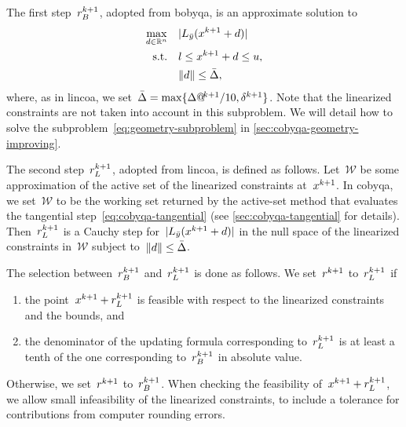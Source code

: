 The first step~$\rstep[k + 1]_B$, adopted from \gls{bobyqa}, is an approximate solution to
\begin{subequations}
    \label{eq:geometry-subproblem}
    \begin{align}
        \max_{\step \in \R^n}   & \quad \abs{\lagp[\bar{y}](\iter[k + 1] + \step)}\\
        \text{s.t.}             & \quad \xl \le \iter[k + 1] + \step \le \xu,\\
                                & \quad \norm{\step} \le \bar{\rad},
    \end{align}
\end{subequations}
where, as in \gls{lincoa}, we set~$\bar{\rad} = \max \set{\rad[k + 1] / 10, \radlb[k + 1]}$.
Note that the linearized constraints are not taken into account in this subproblem.
We will detail how to solve the subproblem~\cref{eq:geometry-subproblem} in \cref{sec:cobyqa-geometry-improving}.

The second step~$\rstep[k + 1]_L$, adopted from \gls{lincoa}, is defined as follows.
Let~$\mathcal{W}$ be some approximation of the active set of the linearized constraints at~$\iter[k + 1]$.
In \gls{cobyqa}, we set~$\mathcal{W}$ to be the working set returned by the active-set method that evaluates the tangential step~\cref{eq:cobyqa-tangential} (see \cref{sec:cobyqa-tangential} for details).
Then~$\rstep[k + 1]_L$ is a Cauchy step for~$\abs{\lagp[\bar{y}](\iter[k + 1] + \step)}$ in the null space of the linearized constraints in~$\mathcal{W}$ subject to~$\norm{\step} \le \bar{\rad}$.

The selection between~$\rstep[k + 1]_B$ and~$\rstep[k + 1]_L$ is done as follows.
We set~$\rstep[k + 1]$ to~$\rstep[k + 1]_L$ if
\begin{enumerate}
    \item the point~$\iter[k + 1] + \rstep[k + 1]_L$ is feasible with respect to the linearized constraints and the bounds, and
    \item the denominator of the updating formula corresponding to~$\rstep[k + 1]_L$ is at least a tenth of the one corresponding to~$\rstep[k + 1]_B$ in absolute value.
\end{enumerate}
Otherwise, we set~$\rstep[k + 1]$ to~$\rstep[k + 1]_B$.
When checking the feasibility of~$\iter[k + 1] + \rstep[k + 1]_L$, we allow small infeasibility of the linearized constraints, to include a tolerance for contributions from computer rounding errors.

